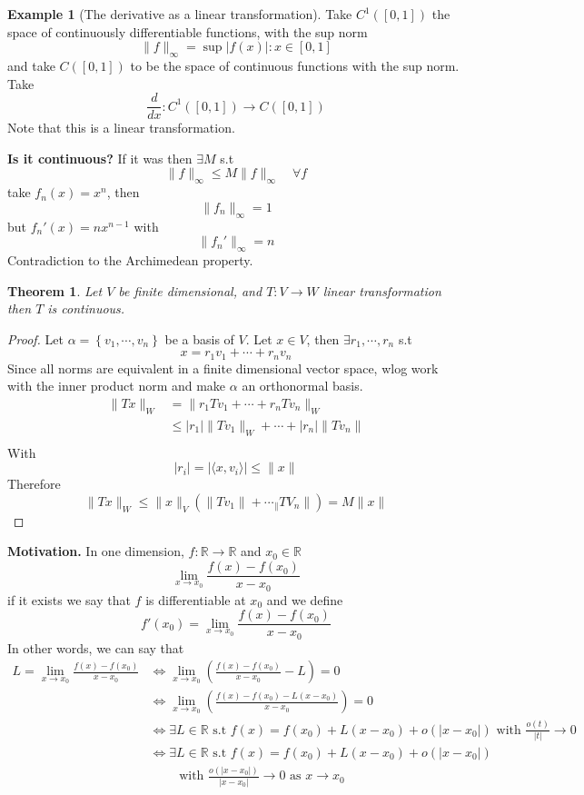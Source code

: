 \documentclass[11pt,a4paper]{article}
\theoremstyle{definition}
\newtheorem{example}[definition]{Example}
\theoremstyle{plain}
\newtheorem{theorem}[definition]{Theorem}
\theoremstyle{remark}
\newcommand{\R}{\mathbb{R}}
\renewcommand{\set}[1]{\left\{ #1 \right\}}
\newcommand{\angles}[1]{\langle #1 \rangle}
\newcommand{\abs}[1]{\lvert #1 \rvert}
\newcommand{\norm}[1]{\lVert #1 \rVert}
\begin{document}
\begin{example}[The derivative as a linear transformation]
    Take $C^1 ([0,1])$ the space of continuously differentiable functions, with the sup norm
    $$\norm{f}_\infty = \sup{|f(x)| \colon x \in [0,1]}$$
    and take $C([0,1])$ to be the space of continuous functions with the sup norm. Take 
    $$\frac{d}{dx} \colon C^1([0,1]) \to C([0,1])$$
    Note that this is a linear transformation. 

    \textbf{Is it continuous?} If it was then $\exists M$ s.t 
    $$\norm{f}_\infty \le M \norm{f}_\infty \quad \forall f$$
    take $f_n(x) = x^n$, then 
    $$\norm{f_n}_\infty = 1$$
    but $f_n'(x) = n x^{n-1}$ with 
    $$\norm{f_n'}_\infty = n$$
    Contradiction to the Archimedean property. 
\end{example}

\begin{theorem}
    Let $V$ be finite dimensional, and $T \colon V \to W$ linear transformation then $T$ is continuous. 
\end{theorem}

\begin{proof}
    Let $\alpha = \set{v_1, \cdots, v_n}$ be a basis of $V$. Let $x \in V$, then $\exists r_1, \cdots, r_n$ s.t 
    $$x = r_1 v_1 + \cdots + r_n v_n$$
    Since all norms are equivalent in a finite dimensional vector space, 
    wlog work with the inner product norm and make $\alpha$ an orthonormal basis. 
    \begin{align*}
        \norm{Tx}_W &= \norm{r_1 Tv_1 + \cdots + r_n Tv_n}_W \\
        &\le |r_1| \norm{T v_1}_W + \cdots + |r_n| \norm{T v_n} \\
    \end{align*}
    With 
    $$\abs{r_i} = \abs{\angles{x, v_i}} \le \norm{x}$$
    Therefore 
    $$\norm{Tx}_W \le \norm{x}_V (\norm{Tv_1} + \cdots _ \norm{TV_n}) = M \norm{x}$$
\end{proof}

\textbf{Motivation.} In one dimension, $f \colon \R \to \R$ and $x_0 \in \R$ 
$$\lim_{x \to x_0} \frac{f(x) - f(x_0)}{x - x_0}$$
if it exists we say that $f$ is differentiable at $x_0$ and we define 
$$f'(x_0) = \lim_{x \to x_0} \frac{f(x) - f(x_0)}{x - x_0}$$
In other words, we can say that 
\begin{align*}
    L = \lim_{x \to x_0} \frac{f(x) - f(x_0)}{x - x_0} &\iff \lim_{x \to x_0} \left(\frac{f(x) - f(x_0)}{x - x_0} - L\right) = 0 \\
    &\iff \lim_{x \to x_0} \left(\frac{f(x) - f(x_0) - L(x - x_0)}{x - x_0}\right) = 0 \\
    &\iff \exists L \in \R \text{ s.t } f(x) = f(x_0) + L(x- x_0) + o(\abs{x - x_0}) \text{ with } \frac{o(t)}{|t|} \to 0 \\
    &\iff\exists L \in \R \text{ s.t } f(x) = f(x_0) + L(x- x_0) + o(\abs{x - x_0}) \\ 
    &\quad\quad \text{ with } \frac{o(|x - x_0|)}{|x - x_0|} \to 0 \text{ as } x \to x_0 \\
\end{align*}
 
\end{document}
